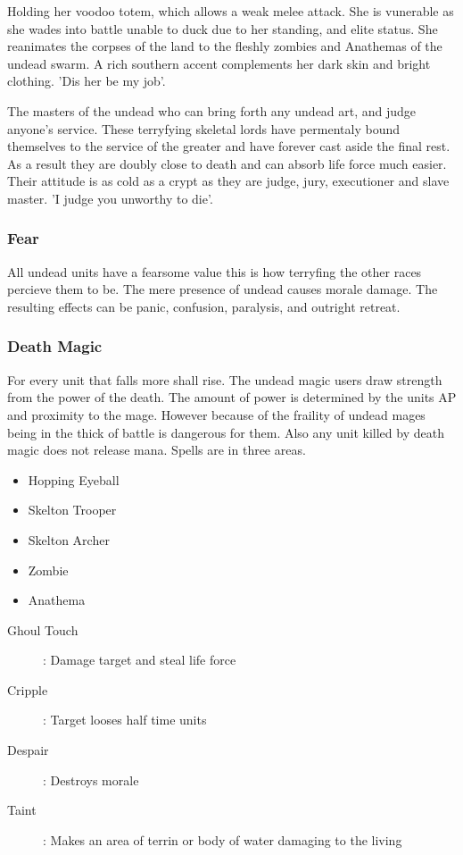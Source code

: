 \documentclass[a4paper]{article}
\begin{document}
Holding her voodoo totem, which allows a weak melee attack. She is vunerable as she wades into battle unable to duck due to her standing, and elite status. She reanimates the corpses of the land to the fleshly zombies and Anathemas of the undead swarm. A rich southern accent complements her dark skin and bright clothing. 'Dis her be my job'.

The masters of the undead who can bring forth any undead art, and judge anyone's service. These terryfying skeletal lords have permentaly bound themselves to the service of the greater and have forever cast aside the final rest. As a result they are doubly close to death and can absorb life force much easier. Their attitude is as cold as a crypt as they are judge, jury, executioner and slave master. 'I judge you unworthy to die'.

\subsubsection{Fear}

All undead units have a fearsome value this is how terryfing the other races percieve them to be. The mere presence of undead causes morale damage. The resulting effects can be panic, confusion, paralysis, and outright retreat.

\subsubsection{Death Magic}

For every unit that falls more shall rise. The undead magic users draw strength from the power of the death. The amount of power is determined by the units AP and proximity to the mage. However because of the fraility of undead mages being in the thick of battle is dangerous for them. Also any unit killed by death magic does not release mana.
Spells are in three areas.

\begin{itemize}
\item Hopping Eyeball
\item Skelton Trooper
\item Skelton Archer
\item Zombie
\item Anathema
\end{itemize}

\begin{description}
\item[Ghoul Touch]: Damage target and steal life force
\item[Cripple]: Target looses half time units
\item[Despair]: Destroys morale
\item[Taint]: Makes an area of terrin or body of water damaging to the living
\end{description}
\end{document}
